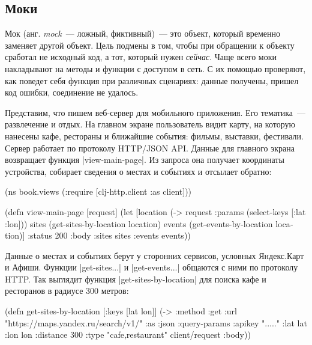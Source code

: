 \subsection{Моки}

Мок (анг. \emph{mock}~--- ложный, фиктивный)~--- это объект, который временно
заменяет другой объект. Цель подмены в том, чтобы при обращении к объекту
сработал не исходный код, а тот, который нужен \emph{сейчас}. Чаще всего моки
накладывают на методы и функции с доступом в сеть. С их помощью проверяют, как
поведет себя функция при различных сценариях: данные получены, пришел код
ошибки, соединение не удалось.

Представим, что пишем веб-сервер для мобильного приложения. Его тематика~---
развлечение и отдых. На главном экране пользователь видит карту, на которую
нанесены кафе, рестораны и ближайшие события: фильмы, выставки,
фестивали. Сервер работает по протоколу HTTP/JSON API. Данные для главного
экрана возвращает функция \spverb|view-main-page|. Из запроса она получает
координаты устройства, собирает сведения о местах и событиях и отсылает обратно:

\begin{english}
  \begin{clojure}
(ns book.views
  (:require [clj-http.client :as client]))

(defn view-main-page [request]
  (let [location (-> request :params (select-keys [:lat :lon]))
        sites (get-sites-by-location location)
        events (get-events-by-location location)]
    {:status 200
     :body {:sites sites :events events}}))
  \end{clojure}
\end{english}

Данные о местах и событиях берут у сторонних сервисов, условных Яндекс.Карт и
Афиши. Функции \spverb|get-sites...| и \spverb|get-events...| общаются с ними по
протоколу HTTP. Так выглядит функция \spverb|get-sites-by-location| для поиска
кафе и ресторанов в радиусе 300 метров:

\begin{english}
  \begin{clojure}
(defn get-sites-by-location
  [{:keys [lat lon]}]
  (-> {:method :get
       :url "https://maps.yandex.ru/search/v1/"
       :as :json
       :query-params {:apikey "....."
                      :lat lat :lon lon :distance 300
                      :type "cafe,restaurant"}}
      client/request
      :body))
  \end{clojure}
\end{english}

